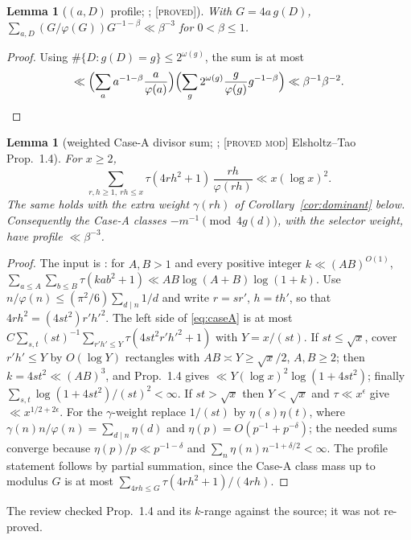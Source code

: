 \documentclass[10pt,reqno]{amsart}
\newtheorem{lemma}[theorem]{Lemma}
\theoremstyle{definition}
\theoremstyle{remark}
\newcommand{\lab}[1]{\textup{[\textsc{#1}]}}
\begin{document}
\begin{lemma}[$(a,D)$ profile; {\cite[Lemma~3.2]{ET}}; \lab{proved}]\label{lem:profileaD}
With $G=4a\,g(D)$,
$\sum_{a,D}(G/\varphi(G))G^{-1-\beta}\ll\beta^{-3}$ for $0<\beta\leq1$.
\end{lemma}
\begin{proof}
Using $\#\{D:g(D)=g\}\leq2^{\omega(g)}$, the sum is at most
\[
 \ll\Bigl(\sum_aa^{-1-\beta}\frac a{\varphi(a)}\Bigr)
 \Bigl(\sum_g2^{\omega(g)}\frac g{\varphi(g)}g^{-1-\beta}\Bigr)\ll\beta^{-1}\beta^{-2}.
\]
\end{proof}

\begin{lemma}[weighted Case-A divisor sum; {\cite[Lemma~3.7]{ET}}; \lab{proved mod} Elsholtz--Tao Prop.~1.4]\label{lem:caseAprofile}
For $x\geq2$,
\begin{equation}\label{eq:caseA}
 \sum_{r,h\geq1,\ rh\leq x}\tau(4rh^2+1)\,\frac{rh}{\varphi(rh)}\ll x(\log x)^2 .
\end{equation}
The same holds with the extra weight $\gamma(rh)$ of
Corollary~\ref{cor:dominant} below.  Consequently the Case-A classes
$-m^{-1}\pmod{4g(d)}$, with the selector weight, have profile
$\ll\beta^{-3}$.
\end{lemma}
\begin{proof}
The input is \cite[Prop.~1.4]{ElsholtzTao}: for $A,B>1$ and every positive
integer $k\ll(AB)^{O(1)}$,
$\sum_{a\leq A}\sum_{b\leq B}\tau(kab^2+1)\ll AB\log(A+B)\log(1+k)$.
Use $n/\varphi(n)\leq(\pi^2/6)\sum_{d\mid n}1/d$ and write $r=sr'$, $h=th'$, so
that $4rh^2=(4st^2)r'h'^2$.  The left side of \eqref{eq:caseA} is at most
$C\sum_{s,t}(st)^{-1}\sum_{r'h'\leq Y}\tau(4st^2r'h'^2+1)$ with $Y=x/(st)$.
If $st\leq\sqrt x$, cover $r'h'\leq Y$ by $O(\log Y)$ rectangles with
$AB\asymp Y\geq\sqrt x/2$, $A,B\geq2$; then $k=4st^2\ll(AB)^3$, and
Prop.~1.4 gives $\ll Y(\log x)^2\log(1+4st^2)$; finally
$\sum_{s,t}\log(1+4st^2)/(st)^2<\infty$.  If $st>\sqrt x$ then $Y<\sqrt x$
and $\tau\ll x^\epsilon$ give $\ll x^{1/2+2\epsilon}$.  For the
$\gamma$-weight replace $1/(st)$ by $\eta(s)\eta(t)$, where
$\gamma(n)n/\varphi(n)=\sum_{d\mid n}\eta(d)$ and $\eta(p)=O(p^{-1}+p^{-\delta})$;
the needed sums converge because $\eta(p)/p\ll p^{-1-\delta}$ and
$\sum_n\eta(n)n^{-1+\delta/2}<\infty$.  The profile statement follows by
partial summation, since the Case-A class mass up to modulus $G$ is at most
$\sum_{4rh\leq G}\tau(4rh^2+1)/(4rh)$.
\end{proof}
The review \cite[item~4]{ETrev} checked Prop.~1.4 and its $k$-range against
the source; it was not re-proved.
\end{document}
